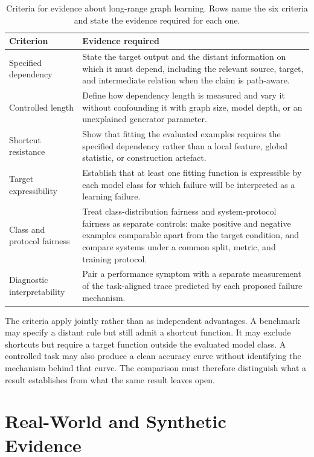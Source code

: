 \begin{table}[t]
\centering
\footnotesize
\setlength{\tabcolsep}{3pt}
\begin{tabular}{L{0.20\textwidth}L{0.68\textwidth}}
\hline
\textbf{Criterion} & \textbf{Evidence required} \\
\hline
Specified dependency & State the target output and the distant information on which it must depend, including the relevant source, target, and intermediate relation when the claim is path-aware. \\
Controlled length & Define how dependency length is measured and vary it without confounding it with graph size, model depth, or an unexplained generator parameter. \\
Shortcut resistance & Show that fitting the evaluated examples requires the specified dependency rather than a local feature, global statistic, or construction artefact. \\
Target expressibility & Establish that at least one fitting function is expressible by each model class for which failure will be interpreted as a learning failure. \\
Class and protocol fairness & Treat class-distribution fairness and system-protocol fairness as separate controls: make positive and negative examples comparable apart from the target condition, and compare systems under a common split, metric, and training protocol. \\
Diagnostic interpretability & Pair a performance symptom with a separate measurement of the task-aligned trace predicted by each proposed failure mechanism. \\
\hline
\end{tabular}
\caption{Criteria for evidence about long-range graph learning.
Rows name the six criteria and state the evidence required for each one.}
\label{tab:sota-evaluation-criteria}
\end{table}

The criteria apply jointly rather than as independent advantages.
A benchmark may specify a distant rule but still admit a shortcut function.
It may exclude shortcuts but require a target function outside the evaluated model class.
A controlled task may also produce a clean accuracy curve without identifying the mechanism behind that curve.
The comparison must therefore distinguish what a result establishes from what the same result leaves open.

\section{Real-World and Synthetic Evidence}

